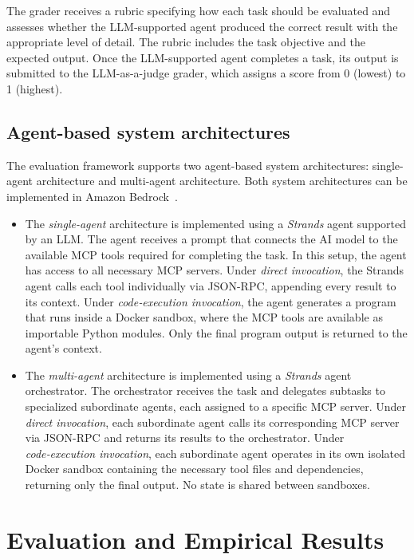 \documentclass[runningheads]{llncs}
\begin{document}
The grader receives a rubric specifying how each task should be evaluated and assesses whether the LLM‑supported agent produced the correct result with the appropriate level of detail. The rubric includes the task objective and the expected output. Once the LLM-supported agent completes a task, its output is submitted to the LLM-as-a-judge grader, which assigns a score from 0 (lowest) to 1 (highest).

\subsection{Agent-based system architectures}

The evaluation framework supports two agent-based system architectures: single-agent architecture and multi-agent architecture. Both system architectures can be implemented in Amazon Bedrock~\cite{aws_bedrock_2026}.

\begin{itemize}

    \item The \textit{single-agent} architecture is implemented using a \textit{Strands} agent supported by an LLM. The agent receives a prompt that connects the AI model to the available MCP tools required for completing the task. In this setup, the agent has access to all necessary MCP servers. Under \textit{direct invocation}, the Strands agent calls each tool individually via JSON-RPC, appending every result to its context. Under \textit{code‑execution invocation}, the agent generates a program that runs inside a Docker sandbox, where the MCP tools are available as importable Python modules. Only the final program output is returned to the agent’s context.

    \item The \textit{multi-agent} architecture is implemented using a \textit{Strands} agent orchestrator. The orchestrator receives the task and delegates subtasks to specialized subordinate agents, each assigned to a specific MCP server. Under \textit{direct invocation}, each subordinate agent calls its corresponding MCP server via JSON-RPC and returns its results to the orchestrator. Under \textit{code‑execution invocation}, each subordinate agent operates in its own isolated Docker sandbox containing the necessary tool files and dependencies, returning only the final output. No state is shared between sandboxes.

\end{itemize}


\section{Evaluation and Empirical Results}
\label{sec:evaluation}
\end{document}
